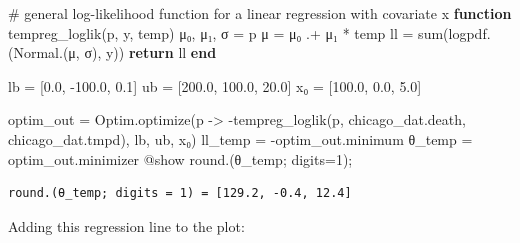 \documentclass[
  letterpaper,
  DIV=11,
  numbers=noendperiod]{scrartcl}
\newenvironment{Shaded}{\begin{snugshade}}{\end{snugshade}}
\newcommand{\CommentTok}[1]{\textcolor[rgb]{0.37,0.37,0.37}{#1}}
\newcommand{\ControlFlowTok}[1]{\textcolor[rgb]{0.00,0.23,0.31}{\textbf{#1}}}
\newcommand{\FloatTok}[1]{\textcolor[rgb]{0.68,0.00,0.00}{#1}}
\newcommand{\FunctionTok}[1]{\textcolor[rgb]{0.28,0.35,0.67}{#1}}
\newcommand{\KeywordTok}[1]{\textcolor[rgb]{0.00,0.23,0.31}{\textbf{#1}}}
\newcommand{\NormalTok}[1]{\textcolor[rgb]{0.00,0.23,0.31}{#1}}
\newcommand{\OperatorTok}[1]{\textcolor[rgb]{0.37,0.37,0.37}{#1}}
\newcommand{\PreprocessorTok}[1]{\textcolor[rgb]{0.68,0.00,0.00}{#1}}
\begin{document}
\begin{Shaded}
\begin{Highlighting}[]
\CommentTok{\# general log{-}likelihood function for a linear regression with covariate x}
\KeywordTok{function} \FunctionTok{tempreg\_loglik}\NormalTok{(p, y, temp)}
\NormalTok{    μ₀, μ₁, σ }\OperatorTok{=}\NormalTok{ p}
\NormalTok{    μ }\OperatorTok{=}\NormalTok{ μ₀ }\OperatorTok{.+}\NormalTok{ μ₁ }\OperatorTok{*}\NormalTok{ temp}
\NormalTok{    ll }\OperatorTok{=} \FunctionTok{sum}\NormalTok{(}\FunctionTok{logpdf}\NormalTok{.(}\FunctionTok{Normal}\NormalTok{.(μ, σ), y))}
    \ControlFlowTok{return}\NormalTok{ ll}
\KeywordTok{end}

\NormalTok{lb }\OperatorTok{=}\NormalTok{ [}\FloatTok{0.0}\NormalTok{, }\OperatorTok{{-}}\FloatTok{100.0}\NormalTok{, }\FloatTok{0.1}\NormalTok{]}
\NormalTok{ub }\OperatorTok{=}\NormalTok{ [}\FloatTok{200.0}\NormalTok{, }\FloatTok{100.0}\NormalTok{, }\FloatTok{20.0}\NormalTok{]}
\NormalTok{x₀ }\OperatorTok{=}\NormalTok{ [}\FloatTok{100.0}\NormalTok{, }\FloatTok{0.0}\NormalTok{, }\FloatTok{5.0}\NormalTok{]}

\NormalTok{optim\_out }\OperatorTok{=}\NormalTok{ Optim.}\FunctionTok{optimize}\NormalTok{(p }\OperatorTok{{-}\textgreater{}} \FunctionTok{{-}tempreg\_loglik}\NormalTok{(p, chicago\_dat.death, chicago\_dat.tmpd), lb, ub, x₀)}
\NormalTok{ll\_temp }\OperatorTok{=} \OperatorTok{{-}}\NormalTok{optim\_out.minimum}
\NormalTok{θ\_temp }\OperatorTok{=}\NormalTok{ optim\_out.minimizer}
\PreprocessorTok{@show} \FunctionTok{round}\NormalTok{.(θ\_temp; digits}\OperatorTok{=}\FloatTok{1}\NormalTok{);}
\end{Highlighting}
\end{Shaded}

\begin{verbatim}
round.(θ_temp; digits = 1) = [129.2, -0.4, 12.4]
\end{verbatim}

Adding this regression line to the plot:
\end{document}

